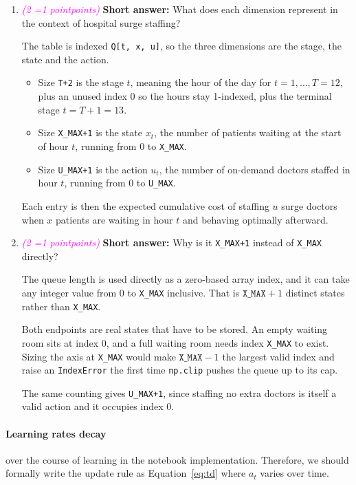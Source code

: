 \documentclass[11pt, letter, answers]{exam}
\newcommand{\grade}[1]{
    \small\textcolor{magenta}{\emph{(#1 \ifnum#1=1 point\else points\fi)}}%
    \normalsize
}
\newcommand{\saq}{\textbf{Short answer: }}
\begin{document}
\begin{enumerate}[label=(\alph*), resume]

\item \grade{2} \saq What does each dimension represent in the context of hospital surge staffing?
\begin{answerBox}[height=2in]
The table is indexed \texttt{Q[t, x, u]}, so the three dimensions are the stage, the state and the action.
\begin{itemize}[nosep]
\item Size \texttt{T+2} is the stage $t$, meaning the hour of the day for $t = 1,\dots,T = 12$, plus an unused index 0 so the hours stay 1-indexed, plus the terminal stage $t = T+1 = 13$.
\item Size \texttt{X\_MAX+1} is the state $x_t$, the number of patients waiting at the start of hour $t$, running from 0 to \texttt{X\_MAX}.
\item Size \texttt{U\_MAX+1} is the action $u_t$, the number of on-demand doctors staffed in hour $t$, running from 0 to \texttt{U\_MAX}.
\end{itemize}
Each entry is then the expected cumulative cost of staffing $u$ surge doctors when $x$ patients are waiting in hour $t$ and behaving optimally afterward.
\end{answerBox}


\item \grade{2} \saq Why is it \texttt{X\_MAX+1} instead of \texttt{X\_MAX} directly?
\begin{answerBox}[height=2in]
The queue length is used directly as a zero-based array index, and it can take any integer value from 0 to \texttt{X\_MAX} inclusive. That is $\texttt{X\_MAX}+1$ distinct states rather than \texttt{X\_MAX}.

Both endpoints are real states that have to be stored. An empty waiting room sits at index 0, and a full waiting room needs index \texttt{X\_MAX} to exist. Sizing the axis at \texttt{X\_MAX} would make $\texttt{X\_MAX}-1$ the largest valid index and raise an \texttt{IndexError} the first time \texttt{np.clip} pushes the queue up to its cap.

The same counting gives \texttt{U\_MAX+1}, since staffing no extra doctors is itself a valid action and it occupies index 0.
\end{answerBox}



\end{enumerate}


\newpage
\paragraph{Learning rates decay} over the course of learning in the notebook implementation. Therefore, we should formally write the update rule as Equation~\ref{eq:td} where $a_t$ varies over time.
\end{document}
